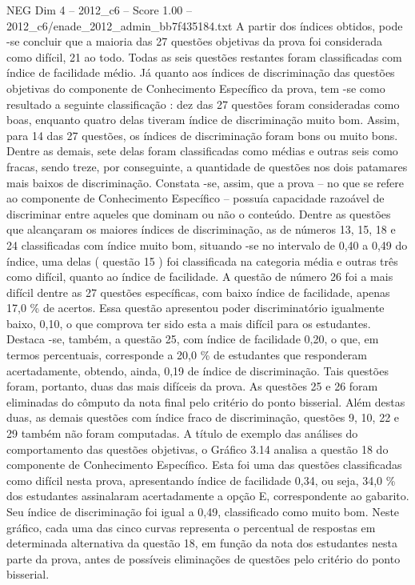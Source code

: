 \begin{textsample}{NEG Dim 4 – 2012\_c6 – Score 1.00 – 2012\_c6/enade\_2012\_admin\_bb7f435184.txt}
A partir dos índices obtidos, pode -se concluir que a maioria das 27 questões objetivas da prova foi considerada como difícil, 21 ao todo.
Todas as seis questões restantes foram classificadas com índice de facilidade médio.
Já quanto aos índices de discriminação das questões objetivas do componente de Conhecimento Específico da prova, tem -se como resultado a seguinte classificação : dez das 27 questões foram consideradas como boas, enquanto quatro delas tiveram índice de discriminação muito bom.
Assim, para 14 das 27 questões, os índices de discriminação foram bons ou muito bons.
Dentre as demais, sete delas foram classificadas como médias e outras seis como fracas, sendo treze, por conseguinte, a quantidade de questões nos dois patamares mais baixos de discriminação.
Constata -se, assim, que a prova – no que se refere ao componente de Conhecimento Específico – possuía capacidade razoável de discriminar entre aqueles que dominam ou não o conteúdo.
Dentre as questões que alcançaram os maiores índices de discriminação, as de números 13, 15, 18 e 24 classificadas com índice muito bom, situando -se no intervalo de 0,40 a 0,49 do índice, uma delas ( questão 15 ) foi classificada na categoria média e outras três como difícil, quanto ao índice de facilidade.
A questão de número 26 foi a mais difícil dentre as 27 questões específicas, com baixo índice de facilidade, apenas 17,0 \% de acertos.
Essa questão apresentou poder discriminatório igualmente baixo, 0,10, o que comprova ter sido esta a mais difícil para os estudantes.
Destaca -se, também, a questão 25, com índice de facilidade 0,20, o que, em termos percentuais, corresponde a 20,0 \% de estudantes que responderam acertadamente, obtendo, ainda, 0,19 de índice de discriminação.
Tais questões foram, portanto, duas das mais difíceis da prova.
As questões 25 e 26 foram eliminadas do cômputo da nota final pelo critério do ponto bisserial.
Além destas duas, as demais questões com índice fraco de discriminação, questões 9, 10, 22 e 29 também não foram computadas.
A título de exemplo das análises do comportamento das questões objetivas, o Gráfico 3.14 analisa a questão 18 do componente de Conhecimento Específico.
Esta foi uma das questões classificadas como difícil nesta prova, apresentando índice de facilidade 0,34, ou seja, 34,0 \% dos estudantes assinalaram acertadamente a opção E, correspondente ao gabarito.
Seu índice de discriminação foi igual a 0,49, classificado como muito bom.
Neste gráfico, cada uma das cinco curvas representa o percentual de respostas em determinada alternativa da questão 18, em função da nota dos estudantes nesta parte da prova, antes de possíveis eliminações de questões pelo critério do ponto bisserial.

\end{textsample}

